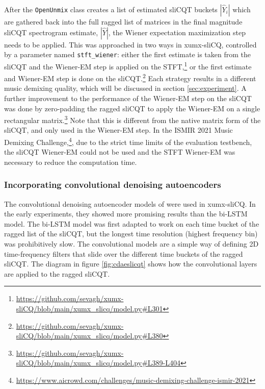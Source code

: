 \documentclass[report.tex]{subfiles}
\begin{document}
\begin{tight_enumerate}
	\item
		After the \Verb#OpenUnmix# class creates a list of estimated sliCQT buckets $|\hat{Y}_{i}|$ which are gathered back into the full ragged list of matrices in the final magnitude sliCQT spectrogram estimate, $|\hat{Y}|$, the Wiener expectation maximization step needs to be applied. This was approached in two ways in xumx-sliCQ, controlled by a parameter named \Verb#stft_wiener#: either the first estimate is taken from the sliCQT and the Wiener-EM step is applied on the STFT,\footnote{\url{https://github.com/sevagh/xumx-sliCQ/blob/main/xumx_slicq/model.py\#L301}} or the first estimate and Wiener-EM step is done on the sliCQT.\footnote{\url{https://github.com/sevagh/xumx-sliCQ/blob/main/xumx_slicq/model.py\#L380}} Each strategy results in a different music demixing quality, which will be discussed in section \ref{sec:experiment}. A further improvement to the performance of the Wiener-EM step on the sliCQT was done by zero-padding the ragged sliCQT to apply the Wiener-EM on a single rectangular matrix.\footnote{\url{https://github.com/sevagh/xumx-sliCQ/blob/main/xumx_slicq/model.py\#L389-L404}} Note that this is different from the native matrix form of the sliCQT, and only used in the Wiener-EM step. In the ISMIR 2021 Music Demixing Challenge,\footnote{\url{https://www.aicrowd.com/challenges/music-demixing-challenge-ismir-2021}}, due to the strict time limits of the evaluation testbench, the sliCQT Wiener-EM could not be used and the STFT Wiener-EM was necessary to reduce the computation time.
\end{tight_enumerate}

\subsubsection{Incorporating convolutional denoising autoencoders}

The convolutional denoising autoencoder models of \textcite{plumbley1, plumbley2} were used in xumx-sliCQ. In the early experiments, they showed more promising results than the bi-LSTM model. The bi-LSTM model was first adapted to work on each time bucket of the ragged list of the sliCQT, but the longest time resolution (highest frequency bin) was prohibitively slow. The convolutional models are a simple way of defining 2D time-frequency filters that slide over the different time buckets of the ragged sliCQT. The diagram in figure \ref{fig:cdaeslicqt} shows how the convolutional layers are applied to the ragged sliCQT.
\end{document}

